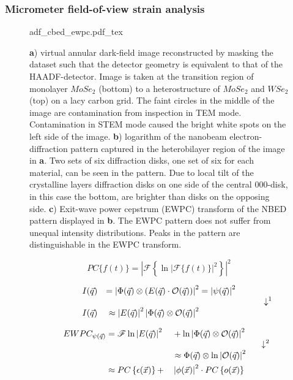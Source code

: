 \subsubsection{Micrometer field-of-view strain analysis}
\begin{figure}[h]
	\centering
	\def\svgwidth{0.9\linewidth}
	{adf_cbed_ewpc.pdf_tex}
    \caption{\textbf{a}) virtual annular dark-field image reconstructed by masking the dataset such that the detector geometry is equivalent to that of the HAADF-detector. Image is taken at the transition region of monolayer $MoSe_2$ (bottom) to a heterostructure of $MoSe_2$ and $WSe_2$ (top) on a lacy carbon grid. The faint circles in the middle of the image are contamination from inspection in TEM mode. Contamination in STEM mode caused the bright white spots on the left side of the image. \textbf{b}) logarithm of the nanobeam electron-diffraction pattern captured in the heterobilayer region of the image in \textbf{a}. Two sets of six diffraction disks, one set of six for each material, can be seen in the pattern. Due to local tilt of the crystalline layers diffraction disks on one side of the central $000$-disk, in this case the bottom, are brighter than disks on the opposing side. \textbf{c}) Exit-wave power cepstrum (EWPC) transform of the NBED pattern displayed in \textbf{b}. The EWPC pattern does not suffer from unequal intensity distributions. Peaks in the pattern are distinguishable in the EWPC transform.}
	\label{fig:adf_nbed_ewpc}
\end{figure}
\begin{equation*}
    PC\{f(t)\} = \left| \mathscr{F} \left\{ \ln{\left| \mathscr{F}\{f(t)\} \right|^2} \right\} \right|^2
    \label{eq:cepstrum}
\end{equation*}

\begin{alignat*}{2}
    I(\vec{q}) &&= \left| \Phi(\vec{q}) \otimes \left( E(\vec{q}) \cdot \mathcal{O}(\vec{q}) \right) \right|^2 &= \left| \psi(\vec{q}) \right|^2\\
    \ArrowBetweenLines*[\downarrow^1\hspace{-3cm}]%
    I(\vec{q}) &&\approx \left|E(\vec{q}) \right|^2 \left|\Phi(\vec{q}) \otimes \mathcal{O}(\vec{q}) \right|^2 &
    \label{eq:cbed_approx}
\end{alignat*}

\begin{alignat*}{3}
    EWPC_{\psi(\vec{q})} &= \mathscr{F}\ln{\left| E(\vec{q}) \right|^2}&&+\ln{\left| \Phi(\vec{q}) \otimes \mathcal{O}(\vec{q}) \right|^2}&\\
    \ArrowBetweenLines*[\downarrow^2\hspace{-4cm}]%
                         & &&\approx \Phi(\vec{q}) \otimes \ln{\left| \mathcal{O}(\vec{q}) \right|^2}&\\
                         &\approx PC\left\{ \epsilon(\vec{x})\right\}+&&\left| \phi(\vec{x})\right|^2 \cdot PC\left\{ o(\vec{x})\right\}&
    \label{eq:sep_env_obj}
\end{alignat*}

